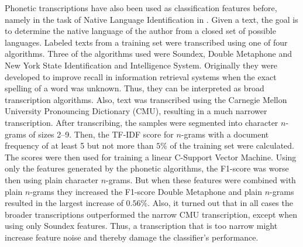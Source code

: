 Phonetic transcriptions have also been used as classification features before, namely in the task of Native Language Identification in \cite{smiley2017native}.
Given a text, the goal is to determine the native language of the author from a closed set of possible languages.
Labeled texts from a training set were transcribed using one of four algorithms.
Three of the algorithms used were Soundex, Double Metaphone and New York State Identification and Intelligence System.
Originally they were developed to improve recall in information retrieval systems when the exact spelling of a word was unknown.
Thus, they can be interpreted as broad transcription algorithms.
Also, text was transcribed using the Carnegie Mellon University Pronouncing Dictionary (CMU), resulting in a much narrower transcription.
After transcribing, the samples were segmented into character $n$-grams of sizes 2--9.
Then, the TF-IDF score for $n$-grams with a document frequency of at least 5 but not more than $5\%$ of the training set were calculated.
The scores were then used for training a linear C-Support Vector Machine.
Using only the features generated by the phonetic algorithms, the F1-score was worse then using plain character $n$-grams.
But when these features were combined with plain $n$-grams they increased the F1-score
Double Metaphone and plain $n$-grams resulted in the largest increase of $0.56\%$.
Also, it turned out that in all cases the broader transcriptions outperformed the narrow CMU transcription, except when using only Soundex features.
Thus, a transcription that is too narrow might increase feature noise and thereby damage the classifier's performance.